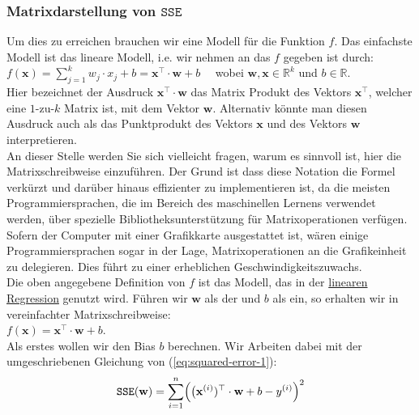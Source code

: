 \documentclass[12pt]{article}
\begin{document}
\subsubsection{Matrixdarstellung von $\mathtt{SSE}$}
%
Um dies zu erreichen brauchen wir eine Modell für die Funktion $f$.  Das einfachste Modell ist das lineare Modell, i.e. wir nehmen an das  $f$ gegeben ist durch: \\[0.2cm]
\hspace*{1.3cm}
$ f(\mathbf{x}) =  \sum\limits_{j=1}^k w_j \cdot x_j + b  =  \mathbf{x^\top} \cdot \mathbf{w} + b  \quad $ 
wobei $ \mathbf{w}, \mathbf{x} \in {\mathbb{R}^k}$ und $ {b\in\mathbb{R}} $.
\\[0.2cm]
Hier bezeichnet der Ausdruck $\mathbf{x}^\top \cdot \mathbf{w}$ das Matrix Produkt des Vektors $\mathbf{x}^\top$, welcher eine $1$-zu-$k$ Matrix ist, mit dem Vektor $\mathbf{w}$. Alternativ könnte man diesen Ausdruck auch als das Punktprodukt des Vektors $\mathbf{x}$ und des Vektors $\mathbf{w}$ interpretieren.\\[0.2cm]
An dieser Stelle werden Sie sich vielleicht fragen, warum es sinnvoll ist, hier die Matrixschreibweise einzuführen. Der Grund ist dass diese Notation die Formel verkürzt und darüber hinaus effizienter zu implementieren ist, da die meisten Programmiersprachen, die im Bereich des maschinellen Lernens verwendet werden, über spezielle Bibliotheksunterstützung für Matrixoperationen verfügen.\\  
Sofern der Computer mit einer Grafikkarte ausgestattet ist, wären einige
Programmiersprachen sogar in der Lage, Matrixoperationen an die Grafikeinheit zu delegieren. Dies führt zu einer erheblichen Geschwindigkeitszuwachs.\\[0.2cm]
%
Die oben angegebene Definition von $f$ ist das Modell, das in der
\href{https://en.wikipedia.org/wiki/Linear_regression}{linearen Regression} genutzt wird. Führen wir $\mathbf{w}$ als der {\color{blue}{Gewichtsvektor}} und $b$ als {\color{blue}{Bias}} ein, so erhalten wir in vereinfachter Matrixschreibweise: 
\\[0.2cm]
\hspace*{4.3cm}
$ f(\mathbf{x}) = \mathbf{x}^\top \cdot \mathbf{w} + b $.
\\[0.2cm]
Als erstes wollen wir den Bias $b$ berechnen. Wir Arbeiten dabei mit der umgeschriebenen Gleichung von (\ref{eq:squared-error-1}):
\begin{equation}
  \label{eq:squared-error-2}
  \mathtt{SSE}(\mathbf{w}) = \sum\limits_{i=1}^n \Bigl(\bigl(\mathbf{x}^{(i)})^\top \cdot \mathbf{w} + b - y^{(i)}\Bigr)^2
\end{equation}
\end{document}
